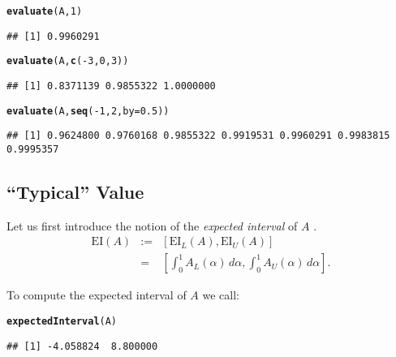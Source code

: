 \documentclass[11pt]{article}\usepackage{graphicx, color}
\makeatletter
\newcommand{\hlfunctioncall}[1]{\textcolor[rgb]{0.501960784313725,0,0.329411764705882}{\textbf{#1}}}%
\newenvironment{kframe}{%
 \def\at@end@of@kframe{}%
 \ifinner\ifhmode%
  \def\at@end@of@kframe{\end{minipage}}%
  \begin{minipage}{\columnwidth}%
 \fi\fi%
 \def\FrameCommand##1{\hskip\@totalleftmargin \hskip-\fboxsep
 \colorbox{shadecolor}{##1}\hskip-\fboxsep
     \hskip-\linewidth \hskip-\@totalleftmargin \hskip\columnwidth}%
 \MakeFramed {\advance\hsize-\width
   \@totalleftmargin\z@ \linewidth\hsize
   \@setminipage}}%
 {\par\unskip\endMakeFramed%
 \at@end@of@kframe}
\newenvironment{knitrout}{}{} %
\makeatother
\begin{document}
\begin{knitrout}\small
{}\color{fgcolor}\begin{kframe}
\begin{alltt}
\hlfunctioncall{evaluate}(A, 1)
\end{alltt}
\begin{verbatim}
## [1] 0.9960291
\end{verbatim}
\begin{alltt}
\hlfunctioncall{evaluate}(A, \hlfunctioncall{c}(-3,0,3))
\end{alltt}
\begin{verbatim}
## [1] 0.8371139 0.9855322 1.0000000
\end{verbatim}
\begin{alltt}
\hlfunctioncall{evaluate}(A, \hlfunctioncall{seq}(-1, 2, by=0.5))
\end{alltt}
\begin{verbatim}
## [1] 0.9624800 0.9760168 0.9855322 0.9919531 0.9960291 0.9983815 0.9995357
\end{verbatim}
\end{kframe}
\end{knitrout}




\subsection{``Typical'' Value}


Let us first introduce the notion of the \textit{expected interval} of $A$
\cite{DuboisPrade1987}.
\begin{eqnarray}
\mathrm{EI}(A) & := & [\mathrm{EI}_L(A), \mathrm{EI}_U(A)] \\
               & = & \left[ \int_0^1 A_L(\alpha)\,d\alpha, \int_0^1 A_U(\alpha)\,d\alpha \right].
\end{eqnarray}

\noindent
To compute the expected interval of $A$ we call:

\begin{knitrout}\small
{}\color{fgcolor}\begin{kframe}
\begin{alltt}
\hlfunctioncall{expectedInterval}(A)
\end{alltt}
\begin{verbatim}
## [1] -4.058824  8.800000
\end{verbatim}
\end{kframe}
\end{knitrout}
\end{document}
